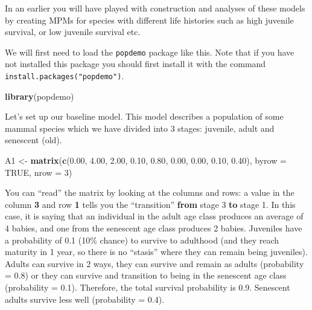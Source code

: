 \documentclass[
  a4paper]{book}
\newenvironment{Shaded}{\begin{snugshade}}{\end{snugshade}}
\newcommand{\AttributeTok}[1]{\textcolor[rgb]{0.13,0.29,0.53}{#1}}
\newcommand{\ConstantTok}[1]{\textcolor[rgb]{0.56,0.35,0.01}{#1}}
\newcommand{\DecValTok}[1]{\textcolor[rgb]{0.00,0.00,0.81}{#1}}
\newcommand{\FloatTok}[1]{\textcolor[rgb]{0.00,0.00,0.81}{#1}}
\newcommand{\FunctionTok}[1]{\textcolor[rgb]{0.13,0.29,0.53}{\textbf{#1}}}
\newcommand{\NormalTok}[1]{#1}
\newcommand{\OtherTok}[1]{\textcolor[rgb]{0.56,0.35,0.01}{#1}}
\begin{document}
In an earlier you will have played with construction and analyses of these models by creating MPMs for species with different life histories such as high juvenile survival, or low juvenile survival etc.

We will first need to load the \texttt{popdemo} package like this. Note that if you have not installed this package you should first install it with the command \texttt{install.packages("popdemo")}.

\begin{Shaded}
\begin{Highlighting}[]
\FunctionTok{library}\NormalTok{(popdemo)}
\end{Highlighting}
\end{Shaded}

Let's set up our baseline model. This model describes a population of some mammal species which we have divided into 3 stages: juvenile, adult and senescent (old).

\begin{Shaded}
\begin{Highlighting}[]
\NormalTok{A1 }\OtherTok{\textless{}{-}} \FunctionTok{matrix}\NormalTok{(}\FunctionTok{c}\NormalTok{(}\FloatTok{0.00}\NormalTok{, }\FloatTok{4.00}\NormalTok{, }\FloatTok{2.00}\NormalTok{, }
               \FloatTok{0.10}\NormalTok{, }\FloatTok{0.80}\NormalTok{, }\FloatTok{0.00}\NormalTok{, }
               \FloatTok{0.00}\NormalTok{, }\FloatTok{0.10}\NormalTok{, }\FloatTok{0.40}\NormalTok{), }
            \AttributeTok{byrow =} \ConstantTok{TRUE}\NormalTok{, }\AttributeTok{nrow =} \DecValTok{3}\NormalTok{)}
\end{Highlighting}
\end{Shaded}

You can ``read'' the matrix by looking at the columns and rows: a value in the column \textbf{3} and row \textbf{1} tells you the ``transition'' \textbf{from} stage 3 \textbf{to} stage 1. In this case, it is saying that an individual in the adult age class produces an average of 4 babies, and one from the senescent age class produces 2 babies. Juveniles have a probability of 0.1 (10\% chance) to survive to adulthood (and they reach maturity in 1 year, so there is no ``stasis'' where they can remain being juveniles). Adults can survive in 2 ways, they can survive and remain as adults (probability = 0.8) or they can survive and transition to being in the senescent age class (probability = 0.1). Therefore, the total survival probability is 0.9. Senescent adults survive less well (probability = 0.4).
\end{document}
